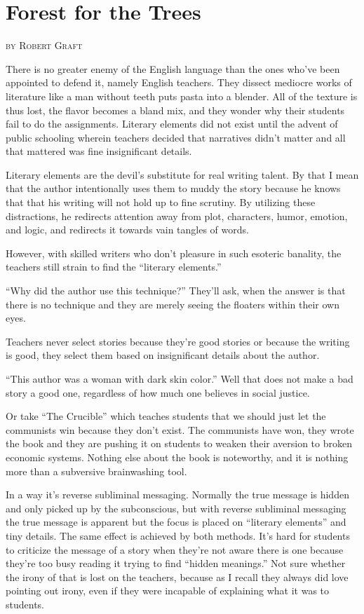 \section{Forest for the Trees}
\begin{flushright}
\textsc{
by Robert Graft}
\end{flushright}
There is no greater enemy of the English language than the ones who've been appointed to defend it, namely English teachers. They dissect mediocre works of literature like a man without teeth puts pasta into a blender. All of the texture is thus lost, the flavor becomes a bland mix, and they wonder why their students fail to do the assignments.
Literary elements did not exist until the advent of public schooling wherein teachers decided that narratives didn't matter and all that mattered was fine insignificant details.

Literary elements are the devil's substitute for real writing talent. By that I mean that the author intentionally uses them to muddy the story because he knows that that his writing will not hold up to fine scrutiny. By utilizing these distractions, he redirects attention away from plot, characters, humor, emotion, and logic, and redirects it towards vain tangles of words.

However, with skilled writers who don't pleasure in such esoteric banality, the teachers still strain to find the ``literary elements.''

``Why did the author use this technique?'' They'll ask, when the answer is that there is no technique and they are merely seeing the floaters within their own eyes.

Teachers never select stories because they're good stories or because the writing is good, they select them based on insignificant details about the author.

``This author was a woman with dark skin color.'' Well that does not make a bad story a good one, regardless of how much one believes in social justice.

Or take ``The Crucible'' which teaches students that we should just let the communists win because they don't exist.
The communists have won, they wrote the book and they are pushing it on students to weaken their aversion to broken economic systems. Nothing else about the book is noteworthy, and it is nothing more than a subversive brainwashing tool.

In a way it's reverse subliminal messaging. Normally the true message is hidden and only picked up by the subconscious, but with reverse subliminal messaging the true message is apparent but the focus is placed on ``literary elements'' and tiny details. The same effect is achieved by both methods. It's hard for students to criticize the message of a story when they're not aware there is one because they're too busy reading it trying to find ``hidden meanings.'' Not sure whether the irony of that is lost on the teachers, because as I recall they always did love pointing out irony, even if they were incapable of explaining what it was to students.

